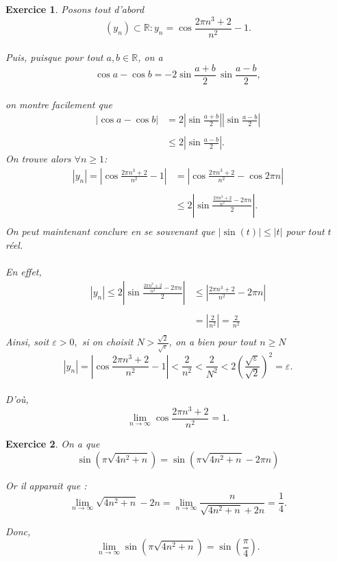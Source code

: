\documentclass{article}
\newcommand{\R}{\mathbb{R}}
\theoremstyle{exercice}
\newtheorem{exercice}{Exercice}
\begin{document}
\newpage
\begin{exercice}
    Posons tout d'abord \[(y_n)\subset \R : y_n = \cos{\frac{2\pi n^3+2}{n^2}}-1.\] \\
    Puis, puisque pour tout $a,b \in \R$, on a \[\cos a - \cos b = -2\sin{\frac{a+b}{2}}\,\sin{\frac{a-b}{2}},\] \\ 
    on montre facilement que
    \begin{align*}
        \left|\cos a - \cos b\right| &= 2\left|\sin{\frac{a+b}{2}}\right|\left|\sin{\frac{a-b}{2}}\right| \\ \\ &\leq 2\left|\sin{\frac{a-b}{2}}\right|.
    \end{align*}
   On trouve alors $\forall n \geq 1$: 
   \begin{align*}
       |y_n| = \left|\cos{\frac{2\pi n^3 + 2}{n^2}}- 1 \right| &=  \left|\cos{\frac{2\pi n^3 + 2}{n^2}}- \cos 2\pi n\right| \\ \\ 
       &\leq 2\left|\sin{\frac{\frac{2\pi n^3+2}{n^2}- 2\pi n}{2}}\right|. \\
   \end{align*}
    On peut maintenant conclure en se souvenant que $|\sin(t)| \leq |t|$ pour tout $t$ réel. \\ \\ En effet, 
    \begin{align*}
        |y_n| \leq 2\left|\sin{\frac{\frac{2\pi n^3+2}{n^2}- 2\pi n}{2}}\right| &\leq \left|\frac{2\pi n^3 + 2}{n^2} - 2\pi n\right| \\ \\
        &= \left|\frac{2}{n^2}\right| = \frac{2}{n^2} \\
    \end{align*}
    Ainsi, soit $\varepsilon > 0,$ si on choisit $N > \frac{\sqrt{2}}{\sqrt{\varepsilon}}$, on a bien pour tout $n \geq N$ \[|y_n| = \left|\cos{\frac{2\pi n^3 + 2}{n^2}}- 1 \right|< \frac{2}{n^2} < \frac{2}{N^2} < 2\left(\frac{\sqrt{\varepsilon}}{\sqrt{2}}\right)^2 =\varepsilon. \] \\
    D'où, \[\lim_{n \to \infty} \cos{\frac{2\pi n^3 + 2}{n^2}} = 1.\]
\end{exercice}

\begin{exercice}
    On a que 
    \begin{equation}
         \sin(\pi \sqrt{4 n^2+n})=\sin(\pi \sqrt{4 n^2+n} -2\pi n)  
    \end{equation}

    Or il apparait que :
    \begin{equation}
        \lim_{n\to \infty} \sqrt{4 n^2+n} -2 n= \lim_{n\to \infty} \dfrac{n}{\sqrt{4 n^2+n} +2 n}=\dfrac{1}{4}.
    \end{equation}

    Donc, 
    \begin{equation}
       \lim_{n\to \infty}  \sin(\pi \sqrt{4 n^2+n})=\sin(\dfrac{\pi}{4}).
    \end{equation}
\end{exercice}
\end{document}
